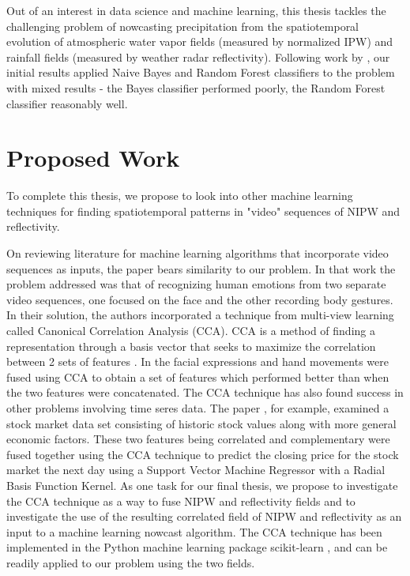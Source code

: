 \documentclass[proposal]{umassthesis}
\begin{document}
{Out of an interest in data science and machine learning, this thesis tackles the challenging problem of nowcasting precipitation from the spatiotemporal evolution of atmospheric water vapor fields (measured by normalized IPW) and rainfall fields (measured by weather radar reflectivity). Following work by \cite{breiman2001random} \cite{mecikalski2015probabilistic}, our initial results applied Naive Bayes and Random Forest classifiers to the problem with mixed results - the Bayes classifier performed poorly, the Random Forest classifier reasonably well.

\section{Proposed Work}

To complete this thesis, we propose to look into other machine learning techniques for finding spatiotemporal patterns in "video" sequences of NIPW and reflectivity.

On reviewing literature for machine learning algorithms that incorporate video sequences as inputs, the paper \cite{shan2007beyond} bears similarity to our problem. In that work the problem addressed was that of recognizing human emotions from two separate video sequences, one focused on the face and the other recording body gestures. In their solution, the authors incorporated a technique from multi-view learning called Canonical Correlation Analysis (CCA). CCA is a method of finding a representation through a basis vector that seeks to maximize the correlation between 2 sets of features \cite{sun2013survey}. In \cite{shan2007beyond} the facial expressions and hand movements were fused using CCA to obtain a set of features which performed better than when the two features were concatenated. The CCA technique has also found success in other problems involving time seres data. The paper \cite{guo2014feature}, for example, examined a stock market data set consisting of historic stock values along with more general economic factors. These two features being correlated and complementary were fused together using the CCA technique to predict the closing price for the stock market the next day using a Support Vector Machine Regressor with a Radial Basis Function Kernel. As one task for our final thesis, we propose to investigate the CCA technique as a way to fuse NIPW and reflectivity fields and to investigate the use of the resulting correlated field of NIPW and reflectivity as an input to a machine learning nowcast algorithm. The CCA technique has been implemented in the Python machine learning package scikit-learn \cite{pedregosa2011scikit}, and can be readily applied to our problem using the two fields.

}
\end{document}
